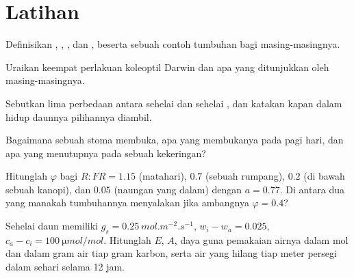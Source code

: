 \section{Latihan}

\begin{exercise}[$\star$]\label{exo:b2:plant-plasticity:1}
Definisikan , , , dan ,
beserta sebuah contoh tumbuhan bagi masing-masingnya.
\end{exercise}

\begin{exercise}[$\star$]\label{exo:b2:plant-plasticity:2}
Uraikan keempat perlakuan koleoptil Darwin dan apa yang ditunjukkan oleh masing-masingnya.
\end{exercise}

\begin{exercise}[$\star$]\label{exo:b2:plant-plasticity:3}
Sebutkan lima perbedaan antara sehelai  dan sehelai , dan katakan kapan dalam hidup daunnya pilihannya diambil.
\end{exercise}

\begin{exercise}[$\star$]\label{exo:b2:plant-plasticity:4}
Bagaimana sebuah stoma membuka, apa yang membukanya pada pagi hari, dan
apa yang menutupnya pada sebuah kekeringan?
\end{exercise}

\begin{exercise}[$\star\star$]\label{exo:b2:plant-plasticity:5}
Hitunglah $\varphi$ bagi $R{:}FR = 1.15$ (matahari), $0.7$ (sebuah
rumpang), $0.2$ (di bawah sebuah kanopi), dan $0.05$ (naungan yang
dalam) dengan $a = 0.77$. Di antara dua yang manakah tumbuhannya
menyalakan  jika ambangnya $\varphi = 0.4$?
\end{exercise}

\begin{exercise}[$\star\star$]\label{exo:b2:plant-plasticity:6}
Sehelai daun memiliki $g_s = \qty{0.25}{mol.m^{-2}.s^{-1}}$, $w_i - w_a = 0.025$,
$c_a - c_i = \qty{100}{\micro mol/mol}$. Hitunglah $E$, $A$, daya guna
pemakaian airnya dalam mol dan dalam gram air tiap gram karbon, serta
air yang hilang tiap meter persegi dalam sehari selama 12 jam.
\end{exercise}

